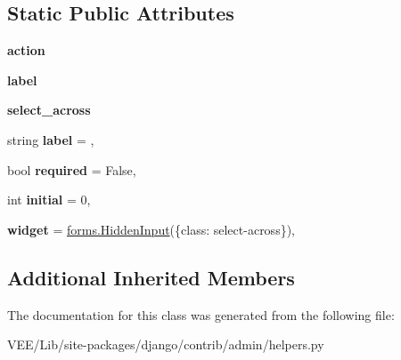 \subsection*{Static Public Attributes}
\begin{DoxyCompactItemize}
\item 
\mbox{\label{classdjango_1_1contrib_1_1admin_1_1helpers_1_1_action_form_ae8583fca9d7c7344eb86f9696cc8bcb5}} 
{\bfseries action}
\item 
\mbox{\label{classdjango_1_1contrib_1_1admin_1_1helpers_1_1_action_form_ad51b3f7d08309f0d21ad06c301d2e7f6}} 
{\bfseries label}
\item 
\mbox{\label{classdjango_1_1contrib_1_1admin_1_1helpers_1_1_action_form_ad19e6a8c1f2eede735a1a35c1bbaf150}} 
{\bfseries select\+\_\+across}
\item 
\mbox{\label{classdjango_1_1contrib_1_1admin_1_1helpers_1_1_action_form_a725676af569d5c2615d697ac22e99d0c}} 
string {\bfseries label} = \textquotesingle{}\textquotesingle{},
\item 
\mbox{\label{classdjango_1_1contrib_1_1admin_1_1helpers_1_1_action_form_aa85f8998beba5cb1f76fb4c878840901}} 
bool {\bfseries required} = False,
\item 
\mbox{\label{classdjango_1_1contrib_1_1admin_1_1helpers_1_1_action_form_ac6657905e950a3bdf79e22aaddc7b198}} 
int {\bfseries initial} = 0,
\item 
\mbox{\label{classdjango_1_1contrib_1_1admin_1_1helpers_1_1_action_form_ace23c1e788784a716f37335d30aef249}} 
{\bfseries widget} = \mbox{\hyperlink{classdjango_1_1forms_1_1widgets_1_1_hidden_input}{forms.\+Hidden\+Input}}(\{\textquotesingle{}class\textquotesingle{}\+: \textquotesingle{}select-\/across\textquotesingle{}\}),
\end{DoxyCompactItemize}
\subsection*{Additional Inherited Members}


The documentation for this class was generated from the following file\+:\begin{DoxyCompactItemize}
\item 
V\+E\+E/\+Lib/site-\/packages/django/contrib/admin/helpers.\+py\end{DoxyCompactItemize}
